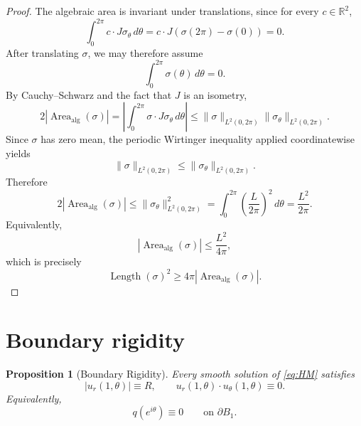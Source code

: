 \documentclass[11pt]{amsart}
\numberwithin{equation}{section}
\newtheorem{proposition}[theorem]{Proposition}
\theoremstyle{remark}
\newcommand{\R}{\mathbb{R}}
\newcommand{\AlgArea}{\operatorname{Area}_{\mathrm{alg}}}
\DeclareMathOperator{\Length}{Length}
\begin{document}
\begin{proof}
The algebraic area is invariant under translations, since for every $c\in\R^2$,
\[
\int_0^{2\pi}c\cdot J\sigma_\theta\, d\theta
=c\cdot J(\sigma(2\pi)-\sigma(0))=0.
\]
After translating $\sigma$, we may therefore assume
\[
\int_0^{2\pi}\sigma(\theta)\, d\theta=0.
\]
By Cauchy--Schwarz and the fact that $J$ is an isometry,
\[
2|\AlgArea(\sigma)|
=\left|\int_0^{2\pi}\sigma\cdot J\sigma_\theta\, d\theta\right|
\le
\|\sigma\|_{L^2(0,2\pi)}\|\sigma_\theta\|_{L^2(0,2\pi)}.
\]
Since $\sigma$ has zero mean, the periodic Wirtinger inequality applied coordinatewise yields
\[
\|\sigma\|_{L^2(0,2\pi)}\le \|\sigma_\theta\|_{L^2(0,2\pi)}.
\]
Therefore
\[
2|\AlgArea(\sigma)|\le \|\sigma_\theta\|_{L^2(0,2\pi)}^2
=\int_0^{2\pi}\left(\frac{L}{2\pi}\right)^2\, d\theta
=\frac{L^2}{2\pi}.
\]
Equivalently,
\[
|\AlgArea(\sigma)|\le \frac{L^2}{4\pi},
\]
which is precisely
\[
\Length(\sigma)^2\ge 4\pi|\AlgArea(\sigma)|.
\]
\end{proof}
\fi

\section{Boundary rigidity}\label{sec:rigidity}

\begin{proposition}[Boundary Rigidity]\label{prop:boundary-rigidity}
Every smooth solution of \eqref{eq:HM} satisfies
\[
|u_r(1,\theta)|\equiv R,
\qquad
u_r(1,\theta)\cdot u_\theta(1,\theta)\equiv0.
\]
Equivalently,
\begin{equation}\label{eq:q-boundary-zero}
q(e^{i\theta})\equiv0
\qquad\text{on }\partial B_1.
\end{equation}
\end{proposition}
\end{document}
